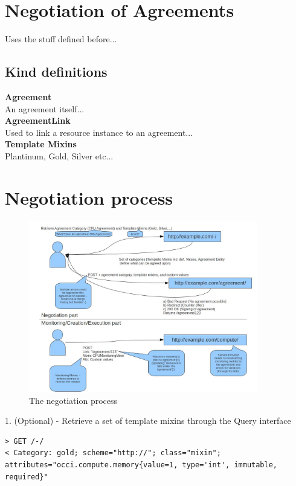 \documentclass[12pt]{article}  %
\begin{document}
\section*{Negotiation of Agreements}
Uses the stuff defined before...
\subsection*{Kind definitions}
{\bf Agreement} \\
An agreement itself... \\
{\bf AgreementLink} \\
Used to link a resource instance to an agreement... \\
{\bf Template Mixins} \\
Plantinum, Gold, Silver etc... \\

\section*{Negotiation process}

\begin{figure}
\centering
\includegraphics[width=100mm]{negotiationProcess.jpg}
\caption{\label{negotiationprocess} The negotiation process}
\end{figure}

   1. (Optional) - Retrieve a set of template mixins through the Query interface

\begin{verbatim}
> GET /-/
< Category: gold; scheme="http://"; class="mixin"; attributes="occi.compute.memory{value=1, type='int', immutable, required}"
\end{verbatim}
\end{document}
